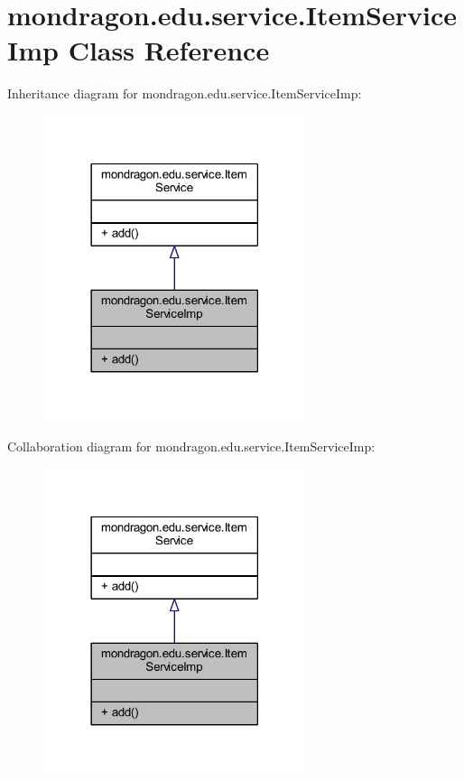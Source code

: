 \hypertarget{classmondragon_1_1edu_1_1service_1_1_item_service_imp}{}\section{mondragon.\+edu.\+service.\+Item\+Service\+Imp Class Reference}
\label{classmondragon_1_1edu_1_1service_1_1_item_service_imp}


Inheritance diagram for mondragon.\+edu.\+service.\+Item\+Service\+Imp\+:\nopagebreak
\begin{figure}[H]
\begin{center}
\leavevmode
\includegraphics[width=218pt]{classmondragon_1_1edu_1_1service_1_1_item_service_imp__inherit__graph}
\end{center}
\end{figure}


Collaboration diagram for mondragon.\+edu.\+service.\+Item\+Service\+Imp\+:\nopagebreak
\begin{figure}[H]
\begin{center}
\leavevmode
\includegraphics[width=218pt]{classmondragon_1_1edu_1_1service_1_1_item_service_imp__coll__graph}
\end{center}
\end{figure}
